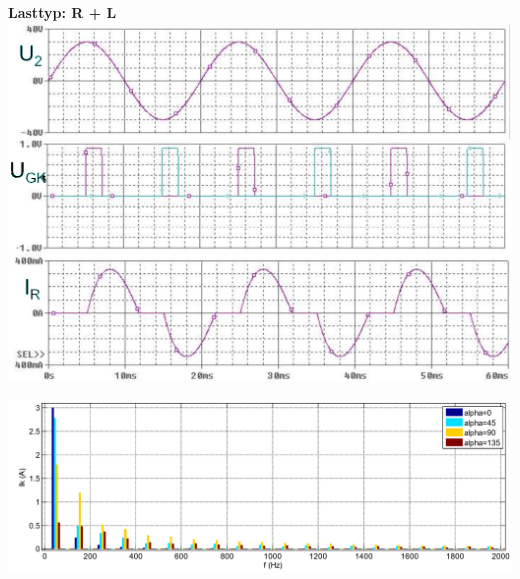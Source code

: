 \begin{minipage}{0.3\linewidth}
    \textbf{Lasttyp: R + L}\newline
    \includegraphics[width=\linewidth]{images/KLWSSteller2}
\end{minipage}

\includegraphics[width=\linewidth]{images/OWWSSteller}

%    
\clearpage
